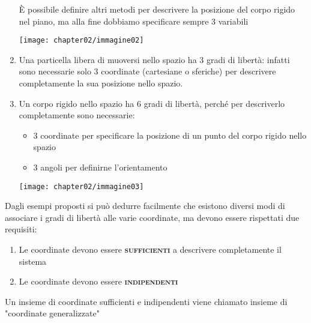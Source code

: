 \begin{enumerate}
\begin{minipage}{.475\textwidth}
					È possibile definire altri metodi per descrivere la posizione del corpo rigido nel piano, ma alla fine dobbiamo specificare sempre 3 variabili
					\end{minipage}
					\hfill
					\begin{minipage}{.475\textwidth}
						\centering
						\texttt{[image: chapter02/immagine02]} 
					\end{minipage}

				\vspace{3mm}
				\item Una particella libera di muoversi nello spazio ha 3 gradi di libertà: infatti sono necessarie solo 3 coordinate (cartesiane o sferiche) per descrivere completamente la sua posizione nello spazio.
				\item Un corpo rigido nello spazio ha 6 gradi di libertà, perché per descriverlo completamente sono necessarie:
	
					\begin{minipage}{.475\textwidth}
						\begin{itemize}
							\item 3 coordinate per specificare la posizione di un punto del corpo rigido nello spazio 
							\item 3  angoli per definirne l'orientamento
						\end{itemize}
					\end{minipage}
					\hfill
					\begin{minipage}{.475\textwidth}
						\centering
						\texttt{[image: chapter02/immagine03]} 
					\end{minipage}
			\end{enumerate}

		\vspace{1cm}
		Dagli esempi proposti si può dedurre facilmente che esistono diversi modi di associare i gradi di libertà alle varie coordinate, ma devono essere rispettati due requisiti:
			\begin{enumerate}
				\item Le coordinate devono essere {\scshape{\bfseries sufficienti}} a descrivere completamente il sistema
				\item Le coordinate devono essere {\scshape{\bfseries indipendenti }}
			\end{enumerate}

		Un insieme di coordinate sufficienti e indipendenti viene chiamato insieme di "coordinate generalizzate"

